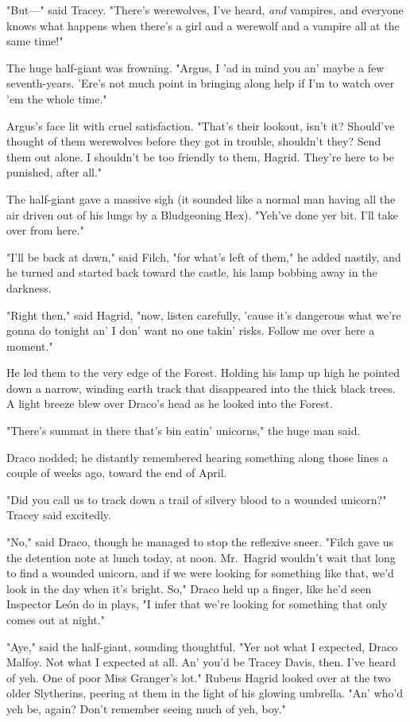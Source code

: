"But---" said Tracey. "There's werewolves, I've heard, \emph{and} vampires, and 
everyone knows what happens when there's a girl and a werewolf and a vampire 
all at the same time!"

The huge half-giant was frowning. "Argus, I 'ad in mind you an' maybe a few 
seventh-years. 'Ere's not much point in bringing along help if I'm to watch 
over 'em the whole time."

Argus's face lit with cruel satisfaction. "That's their lookout, isn't it? 
Should've thought of them werewolves before they got in trouble, shouldn't 
they? Send them out alone. I shouldn't be too friendly to them, Hagrid. They're 
here to be punished, after all."

The half-giant gave a massive sigh (it sounded like a normal man having all the 
air driven out of his lungs by a Bludgeoning Hex). "Yeh've done yer bit. I'll 
take over from here."

"I'll be back at dawn," said Filch, "for what's left of them," he added 
nastily, and he turned and started back toward the castle, his lamp bobbing 
away in the darkness.

"Right then," said Hagrid, "now, listen carefully, 'cause it's dangerous what 
we're gonna do tonight an' I don' want no one takin' risks. Follow me over here 
a moment."

He led them to the very edge of the Forest. Holding his lamp up high he pointed 
down a narrow, winding earth track that disappeared into the thick black trees. 
A light breeze blew over Draco's head as he looked into the Forest.

"There's summat in there that's bin eatin' unicorns," the huge man said.

Draco nodded; he distantly remembered hearing something along those lines a 
couple of weeks ago, toward the end of April.

"Did you call us to track down a trail of silvery blood to a wounded unicorn?" 
Tracey said excitedly.

"No," said Draco, though he managed to stop the reflexive sneer. "Filch gave us 
the detention note at lunch today, at noon. Mr.~Hagrid wouldn't wait that long 
to find a wounded unicorn, and if we were looking for something like that, we'd 
look in the day when it's bright. So," Draco held up a finger, like he'd seen 
Inspector León do in plays, "I infer that we're looking for something that only 
comes out at night."

"Aye," said the half-giant, sounding thoughtful. "Yer not what I expected, 
Draco Malfoy. Not what I expected at all. An' you'd be Tracey Davis, then. I've 
heard of yeh. One of poor Miss Granger's lot." Rubeus Hagrid looked over at the 
two older Slytherins, peering at them in the light of his glowing umbrella. 
"An' who'd yeh be, again? Don't remember seeing much of yeh, boy."

